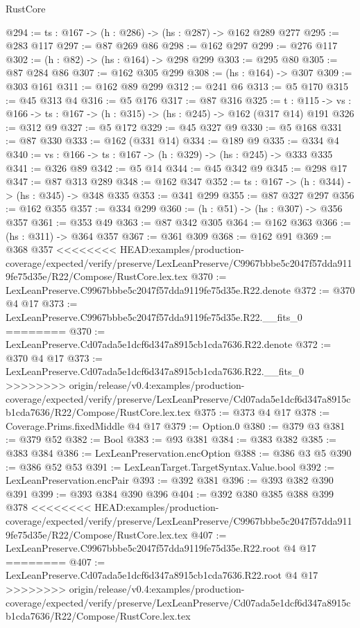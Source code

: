 \begin{lexlean}{RustCore}
\begin{coremodule}
{\begin{coremodule}
@294 := {ts : @167} -> (h : @286) -> (hs : @287) -> @162 @289 @277
@295 := @283 @117
@297 := @87 @269 @86
@298 := @162 @297
@299 := @276 @117
@302 := (h : @82) -> (hs : @164) -> @298 @299
@303 := @295 @80
@305 := @87 @284 @86
@307 := @162 @305 @299
@308 := (hs : @164) -> @307
@309 := @303 @161
@311 := @162 @89 @299
@312 := @241 @6
@313 := @5 @170
@315 := @45 @313 @4
@316 := @5 @176
@317 := @87 @316
@325 := {t : @115} ->
  {vs : @166} -> {ts : @167} -> (h : @315) -> (hs : @245) -> @162 (@317 @14) @191
@326 := @312 @9
@327 := @5 @172
@329 := @45 @327 @9
@330 := @5 @168
@331 := @87 @330
@333 := @162 (@331 @14)
@334 := @189 @9
@335 := @334 @4
@340 := {vs : @166} -> {ts : @167} -> (h : @329) -> (hs : @245) -> @333 @335
@341 := @326 @89
@342 := @5 @14
@344 := @45 @342 @9
@345 := @298 @17
@347 := @87 @313 @289
@348 := @162 @347
@352 := {ts : @167} -> (h : @344) -> (hs : @345) -> @348 @335
@353 := @341 @299
@355 := @87 @327 @297
@356 := @162 @355
@357 := @334 @299
@360 := (h : @51) -> (hs : @307) -> @356 @357
@361 := @353 @49
@363 := @87 @342 @305
@364 := @162 @363
@366 := (hs : @311) -> @364 @357
@367 := @361 @309
@368 := @162 @91
@369 := @368 @357
<<<<<<<< HEAD:examples/production-coverage/expected/verify/preserve/LexLeanPreserve/C9967bbbe5c2047f57dda9119fe75d35e/R22/Compose/RustCore.lex.tex
@370 := LexLeanPreserve.C9967bbbe5c2047f57dda9119fe75d35e.R22.denote
@372 := @370 @4 @17
@373 := LexLeanPreserve.C9967bbbe5c2047f57dda9119fe75d35e.R22.__fits_0
========
@370 := LexLeanPreserve.Cd07ada5e1dcf6d347a8915cb1cda7636.R22.denote
@372 := @370 @4 @17
@373 := LexLeanPreserve.Cd07ada5e1dcf6d347a8915cb1cda7636.R22.__fits_0
>>>>>>>> origin/release/v0.4:examples/production-coverage/expected/verify/preserve/LexLeanPreserve/Cd07ada5e1dcf6d347a8915cb1cda7636/R22/Compose/RustCore.lex.tex
@375 := @373 @4 @17
@378 := Coverage.Prims.fixedMiddle @4 @17
@379 := Option.{0}
@380 := @379 @3
@381 := @379 @52
@382 := Bool
@383 := @93 @381
@384 := @383 @382
@385 := @383 @384
@386 := LexLeanPreservation.encOption
@388 := @386 @3 @5
@390 := @386 @52 @53
@391 := LexLeanTarget.TargetSyntax.Value.bool
@392 := LexLeanPreservation.encPair
@393 := @392 @381
@396 := @393 @382 @390 @391
@399 := @393 @384 @390 @396
@404 := @392 @380 @385 @388 @399 @378
<<<<<<<< HEAD:examples/production-coverage/expected/verify/preserve/LexLeanPreserve/C9967bbbe5c2047f57dda9119fe75d35e/R22/Compose/RustCore.lex.tex
@407 := LexLeanPreserve.C9967bbbe5c2047f57dda9119fe75d35e.R22.root @4 @17
========
@407 := LexLeanPreserve.Cd07ada5e1dcf6d347a8915cb1cda7636.R22.root @4 @17
>>>>>>>> origin/release/v0.4:examples/production-coverage/expected/verify/preserve/LexLeanPreserve/Cd07ada5e1dcf6d347a8915cb1cda7636/R22/Compose/RustCore.lex.tex

\end{coremodule}}
\end{coremodule}
\end{lexlean}
